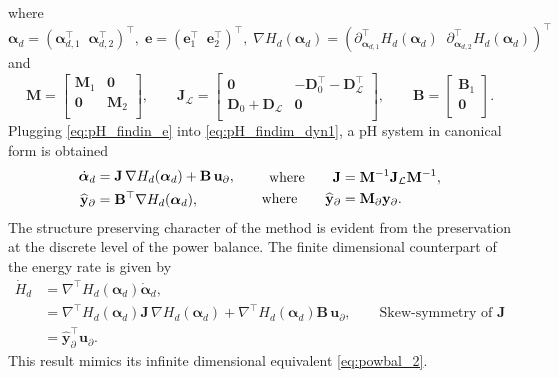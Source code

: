 where $\bm{\alpha}_{d}= (\bm{\alpha}_{d, 1}^\top \;\; \bm{\alpha}_{d, 2}^\top)^\top, \; \mathbf{e}= (\mathbf{e}_1^\top \;\; \mathbf{e}_2^\top)^\top, \; \nabla H_d(\bm{\alpha}_d) = (\partial_{\bm{\alpha}_{d, 1}}^\top H_d(\bm{\alpha}_d) \;\; \partial_{\bm{\alpha}_{d, 2}}^\top H_d(\bm{\alpha}_d))^\top$ and 
\begin{equation}
\mathbf{M} = \begin{bmatrix}
\mathbf{M}_1 & \mathbf{0} \\
\mathbf{0} & \mathbf{M}_2 \\
\end{bmatrix}, \qquad 
\mathbf{J}_\mathcal{L}= \begin{bmatrix}
\mathbf{0} & -\mathbf{D}_{0}^\top - \mathbf{D}_{\mathcal{L}}^\top \\
\mathbf{D}_{0} + \mathbf{D}_{\mathcal{L}} & \mathbf{0} \\
\end{bmatrix}, \qquad
\mathbf{B} =
\begin{bmatrix}
\mathbf{B}_1\\
\mathbf{0}\\
\end{bmatrix}.
\end{equation}
Plugging \eqref{eq:pH_findin_e} into \eqref{eq:pH_findim_dyn1}, a pH system in canonical form is obtained
\begin{equation}
	\begin{aligned}
	\dot{\bm{\alpha}}_{d} &= \mathbf{J}\, \nabla H_d(\bm{\alpha}_d) + \mathbf{B}\, \mathbf{u}_\partial,\\
	\widehat{\mathbf{y}}_\partial &= \mathbf{B}^\top \nabla H_d(\bm{\alpha}_d), 
	\end{aligned}
	\begin{aligned}
	\qquad \text{where} \qquad \mathbf{J} &= \mathbf{M}^{-1} \mathbf{J}_\mathcal{L} \mathbf{M}^{-1},\\
	\qquad \text{where} \qquad \widehat{\mathbf{y}}_\partial &= \mathbf{M}_\partial \mathbf{y}_\partial.
	\end{aligned}
\end{equation}
The structure preserving character of the method is evident from the preservation at the discrete level of the power balance. The finite dimensional counterpart of the energy rate is given by
\begin{equation}
\begin{aligned}
\dot{H}_d &= \nabla^\top H_d(\bm{\alpha}_d) \dot{\bm{\alpha}}_d, \\
&= \nabla^\top H_d(\bm{\alpha}_d) \mathbf{J}\, \nabla H_d(\bm{\alpha}_d) + \nabla^\top H_d(\bm{\alpha}_d) \mathbf{B}\, \mathbf{u}_\partial, \qquad \text{Skew-symmetry of }\mathbf{J} \\
&= \widehat{\mathbf{y}}_\partial^\top \mathbf{u}_\partial.
\end{aligned}
\end{equation}
This result mimics its infinite dimensional equivalent \eqref{eq:powbal_2}.

